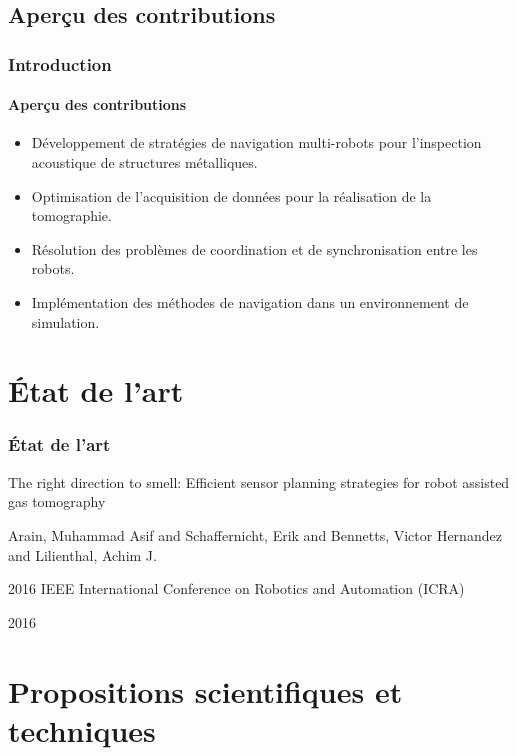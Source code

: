 \documentclass{beamer}
\begin{document}
		\subsection*{Aperçu des contributions}
			\begin{frame}
				\frametitle{Introduction}
				\framesubtitle{Aperçu des contributions}
				\begin{itemize}
					\item Développement de stratégies de navigation multi-robots pour l'inspection acoustique de structures métalliques.
					\item Optimisation de l'acquisition de données pour la réalisation de la tomographie.
					\item Résolution des problèmes de coordination et de synchronisation entre les robots.
					\item Implémentation des méthodes de navigation dans un environnement de simulation.
				\end{itemize}
			\end{frame}
	\section{État de l'art}
		\begin{frame}
			\frametitle{État de l'art}
			The right direction to smell: Efficient sensor planning strategies for robot assisted gas tomography

			Arain, Muhammad Asif and Schaffernicht, Erik and Bennetts, Victor Hernandez and Lilienthal, Achim J.

			2016 IEEE International Conference on Robotics and Automation (ICRA)

			2016
		\end{frame}
	\section{Propositions scientifiques et techniques}
\end{document}

